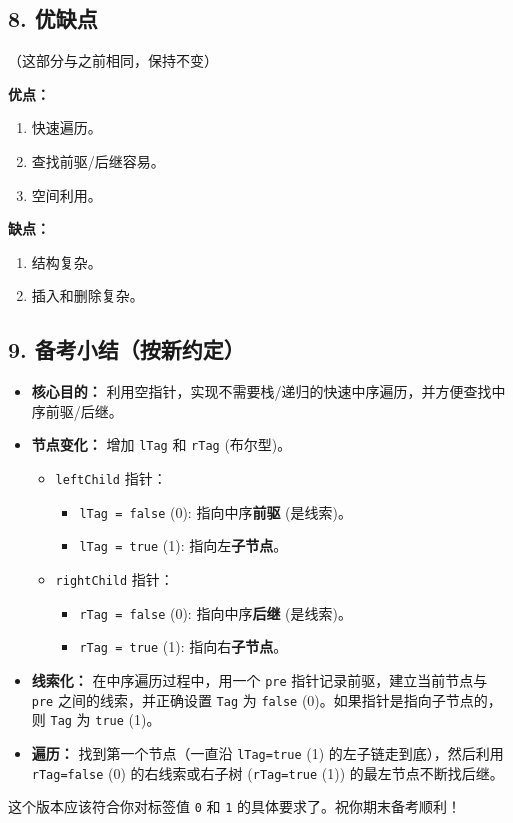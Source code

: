\subsection{8. 优缺点}

（这部分与之前相同，保持不变）

\textbf{优点：}

\begin{enumerate}
	\item 快速遍历。
	\item 查找前驱/后继容易。
	\item 空间利用。
\end{enumerate}

\textbf{缺点：}

\begin{enumerate}
	\item 结构复杂。
	\item 插入和删除复杂。
\end{enumerate}

\subsection{9. 备考小结（按新约定）}

\begin{itemize}
	\item \textbf{核心目的：} 利用空指针，实现不需要栈/递归的快速中序遍历，并方便查找中序前驱/后继。
	\item \textbf{节点变化：} 增加 \lstinline{lTag} 和 \lstinline{rTag} (布尔型)。
	\begin{itemize}
		\item \lstinline{leftChild} 指针：
		\begin{itemize}
			\item \lstinline{lTag = false} (0): 指向中序\textbf{前驱} (是线索)。
			\item \lstinline{lTag = true} (1): 指向左\textbf{子节点}。
		\end{itemize}
		\item \lstinline{rightChild} 指针：
		\begin{itemize}
			\item \lstinline{rTag = false} (0): 指向中序\textbf{后继} (是线索)。
			\item \lstinline{rTag = true} (1): 指向右\textbf{子节点}。
		\end{itemize}
	\end{itemize}
	\item \textbf{线索化：} 在中序遍历过程中，用一个 \lstinline{pre} 指针记录前驱，建立当前节点与 \lstinline{pre} 之间的线索，并正确设置 \lstinline{Tag} 为 \lstinline{false} (0)。如果指针是指向子节点的，则 \lstinline{Tag} 为 \lstinline{true} (1)。
	\item \textbf{遍历：} 找到第一个节点（一直沿 \lstinline{lTag=true} (1) 的左子链走到底），然后利用 \lstinline{rTag=false} (0) 的右线索或右子树 (\lstinline{rTag=true} (1)) 的最左节点不断找后继。
\end{itemize}

这个版本应该符合你对标签值 \lstinline{0} 和 \lstinline{1} 的具体要求了。祝你期末备考顺利！
